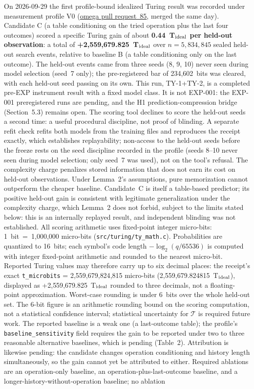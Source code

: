 \documentclass[11pt]{article}
\begin{document}
On 2026-09-29 the first profile-bound idealized Turing result was recorded under measurement profile V0 (\href{https://github.com/aien-dev/omega/pull/85}{omega pull request~85}, merged the same day). Candidate C (a table conditioning on the tried operation plus the last four outcomes) scored a specific Turing gain of about \textbf{0.44~T\(_{\rm ideal}\) per held-out observation}: a total of \textbf{+2,559,679.825~T\(_{\rm ideal}\)} over \(n = 5{,}834{,}845\) sealed held-out search events, relative to baseline B (a table conditioning only on the last outcome). The held-out events came from three seeds (8, 9, 10) never seen during model selection (seed~7 only); the pre-registered bar of 234,602~bits was cleared, with each held-out seed passing on its own. This run, TY-1+TY-2, is a completed pre-EXP instrument result with a fixed model class. It is not EXP-001: the EXP-001 preregistered runs are pending, and the H1 prediction-compression bridge (Section~5.3) remains open. The scoring tool declines to score the held-out seeds a second time: a useful procedural discipline, not proof of blinding. A separate refit check refits both models from the training files and reproduces the receipt exactly, which establishes replayability; non-access to the held-out seeds before the freeze rests on the seed discipline recorded in the profile (seeds 8--10 never seen during model selection; only seed~7 was used), not on the tool's refusal. The complexity charge penalizes stored information that does not earn its cost on held-out observations. Under Lemma~2's assumptions, pure memorization cannot outperform the cheaper baseline. Candidate~C is itself a table-based predictor; its positive held-out gain is consistent with legitimate generalization under the complexity charge, which Lemma~2 does not forbid, subject to the limits stated below: this is an internally replayed result, and independent blinding was not established. All scoring arithmetic uses fixed-point integer micro-bits: 1~bit~=~1{,}000{,}000 micro-bits (\texttt{src/turing/ty\_math.c}). Probabilities are quantized to 16~bits; each symbol's code length \(-\log_2(q/65536)\) is computed with integer fixed-point arithmetic and rounded to the nearest micro-bit. Reported Turing values may therefore carry up to six decimal places: the receipt's exact \texttt{t\_microbits} = 2{,}559{,}679{,}824{,}815 micro-bits (2{,}559{,}679.824815~T\(_{\rm ideal}\)), displayed as +2{,}559{,}679.825~T\(_{\rm ideal}\) rounded to three decimals, not a floating-point approximation. Worst-case rounding is under 6~bits over the whole held-out set. The 6-bit figure is an arithmetic rounding bound on the scoring computation, not a statistical confidence interval; statistical uncertainty for \(\mathcal{T}\) is required future work. The reported baseline is a weak one (a last-outcome table); the profile's \texttt{baseline\_sensitivity} field requires the gain to be reported under two to three reasonable alternative baselines, which is pending (Table~2). Attribution is likewise pending: the candidate changes operation conditioning and history length simultaneously, so the gain cannot yet be attributed to either. Required ablations are an operation-only baseline, an operation-plus-last-outcome baseline, and a longer-history-without-operation baseline; no ablation 
\end{document}
